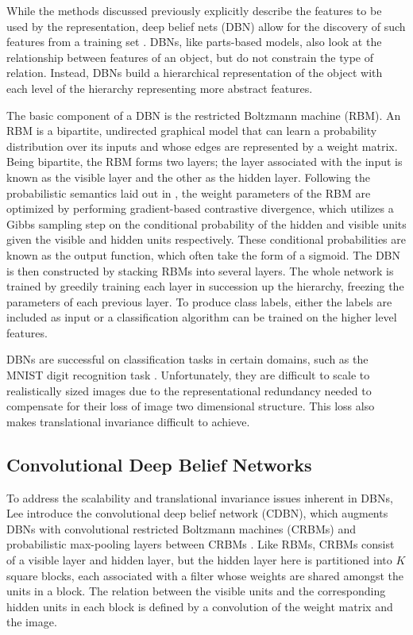 \documentclass[10pt,twocolumn,letterpaper]{article}
\begin{document}
While the methods discussed previously explicitly describe the features to be used
by the representation, deep belief nets (DBN) allow for the discovery of such features
from a training set \cite{HintonDBN} \cite{CDBN}.
DBNs, like parts-based models, also look at the relationship between features of an object,
but do not constrain the type of relation.
Instead, DBNs build a hierarchical representation of the object with each level of the hierarchy
representing more abstract features.

The basic component of a DBN is the restricted Boltzmann machine (RBM).
An RBM is a bipartite, undirected graphical model that can learn a probability distribution
over its inputs and whose edges are represented by a weight matrix.
Being bipartite, the RBM forms two layers; the layer associated with the input is known
as the visible layer and the other as the hidden layer.
Following the probabilistic semantics laid out in \cite{CDBN}, the weight parameters of the RBM
are optimized by performing gradient-based contrastive divergence, which utilizes a
Gibbs sampling step on the conditional probability of the hidden and visible units given
the visible and hidden units respectively.
These conditional probabilities are known as the output function, which often take the form of a sigmoid.
The DBN is then constructed by stacking RBMs into several layers.
The whole network is trained by greedily training each layer in succession up the hierarchy,
freezing the parameters of each previous layer.
To produce class labels, either the labels are included as input or a classification algorithm
can be trained on the higher level features.

DBNs are successful on classification tasks in certain domains, such as the MNIST digit recognition
task \cite{HintonDBN}. Unfortunately, they are difficult to scale to realistically sized images
due to the representational redundancy needed to compensate for their loss of image
two dimensional structure. This loss also makes translational invariance difficult to achieve.

\subsection{Convolutional Deep Belief Networks}

To address the scalability and translational invariance issues inherent in DBNs,
Lee \etal introduce the convolutional deep belief network (CDBN),
which augments DBNs with convolutional restricted Boltzmann machines (CRBMs)
and probabilistic max-pooling layers between CRBMs \cite{CDBN}.
Like RBMs, CRBMs consist of a visible layer and hidden layer, but the hidden
layer here is partitioned into $K$ square blocks, each associated with a filter
whose weights are shared amongst the units in a block.
The relation between the visible units and the corresponding hidden units in each
block is defined by a convolution of the weight matrix and the image.
\end{document}
